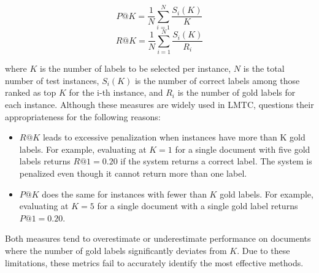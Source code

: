 \begin{equation}
P@K = \frac{1}{N} \sum_{i=1}^N \frac{S_i(K)}{K}
\end{equation}
\begin{equation}
R@K = \frac{1}{N} \sum_{i=1}^N \frac{S_i(K)}{R_i}
\end{equation}

where $K$ is the number of labels to be selected per instance, $N$ is the total number of test instances, $S_i(K)$ is the number of correct labels among those ranked as top $K$ for the i-th instance, and $R_i$ is the number of gold labels for each instance.
Although these measures are widely used in LMTC, \textcite{chalkidis-etal-2019-large} questions their appropriateness for the following reasons:
\begin{itemize}
    \item $R@K$ leads to excessive penalization when instances have more than K gold labels. 
    For example, evaluating at $K = 1$ for a single document with five gold labels returns $R@1 = 0.20$ if the system returns a correct label. 
    The system is penalized even though it cannot return more than one label.
    \item $P@K$ does the same for instances with fewer than $K$ gold labels. 
    For example, evaluating at $K = 5$ for a single document with a single gold label returns $P@1 = 0.20$.
\end{itemize}

Both measures tend to overestimate or underestimate performance on documents where the number of gold labels significantly deviates from $K$.
Due to these limitations, these metrics fail to accurately identify the most effective methods.

